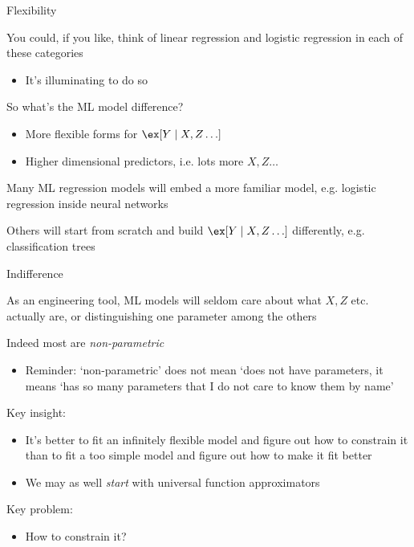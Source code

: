 \documentclass{hertieteaching}
\begin{document}
\begin{frame}{Flexibility}

You could, if you like, think of linear regression and logistic regression in each of these categories
\begin{itemize}
  \item It's illuminating to do so \parencite[see the first few chapters of][] {Bishop2006}
\end{itemize}

So what's the ML model difference?
\begin{itemize}
  \item More flexible forms for $\ex[Y \mid X, Z\ldots]$
  \item Higher dimensional predictors, i.e. lots more $X, Z\ldots$
\end{itemize}
Many ML regression models will embed a more familiar model, e.g. logistic regression inside neural networks

Others will start from scratch and build $\ex[Y \mid X, Z\ldots]$ differently, e.g. classification trees



\end{frame}

\begin{frame}{Indifference}

As an engineering tool, ML models will seldom care about what $X, Z$ etc. actually are, or distinguishing one parameter among the others

Indeed most are \textit{non-parametric}
\begin{itemize}
  \item Reminder: `non-parametric' does not mean `does not have parameters, it means `has so many parameters that I do not care to know them by name'
\end{itemize}

Key insight: 
\begin{itemize}
  \item It's better to fit an infinitely flexible model and figure out how to constrain it than to fit a too simple model and figure out how to make it fit better
  \item We may as well \textit{start} with universal function approximators \parencite{Hornik.etal1989}
\end{itemize}

Key problem: 
\begin{itemize}
  \item How to constrain it?
\end{itemize}

\end{frame}
\end{document}
